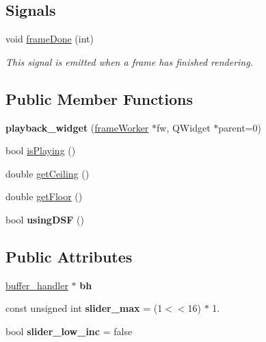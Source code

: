 \subsection*{Signals}
\begin{DoxyCompactItemize}
\item 
\hypertarget{classplayback__widget_aea2a79a747ca2a8690481ad9fbd30ad4}{void \hyperlink{classplayback__widget_aea2a79a747ca2a8690481ad9fbd30ad4}{frame\+Done} (int)}\label{classplayback__widget_aea2a79a747ca2a8690481ad9fbd30ad4}

\begin{DoxyCompactList}\small\item\em This signal is emitted when a frame has finished rendering. \end{DoxyCompactList}\end{DoxyCompactItemize}
\subsection*{Public Member Functions}
\begin{DoxyCompactItemize}
\item 
\hypertarget{classplayback__widget_a2d182d191c21f8167357d78a473c19b7}{{\bfseries playback\+\_\+widget} (\hyperlink{classframeWorker}{frame\+Worker} $\ast$fw, Q\+Widget $\ast$parent=0)}\label{classplayback__widget_a2d182d191c21f8167357d78a473c19b7}

\item 
bool \hyperlink{group__getters_ga601167298dbe870b1f2e9591f9372a75}{is\+Playing} ()
\item 
double \hyperlink{group__getters_gab47096c65caf5ac4f58049350a7a8289}{get\+Ceiling} ()
\item 
double \hyperlink{group__getters_gaf9c55fffe8aebf0cfb7c00b33b1e1a04}{get\+Floor} ()
\item 
\hypertarget{classplayback__widget_ae40db438ff07e5b5462a2f33ce067674}{bool {\bfseries using\+D\+S\+F} ()}\label{classplayback__widget_ae40db438ff07e5b5462a2f33ce067674}

\end{DoxyCompactItemize}
\subsection*{Public Attributes}
\begin{DoxyCompactItemize}
\item 
\hypertarget{classplayback__widget_a92eeaf4eac0a78442cafb7975ac796a3}{\hyperlink{classbuffer__handler}{buffer\+\_\+handler} $\ast$ {\bfseries bh}}\label{classplayback__widget_a92eeaf4eac0a78442cafb7975ac796a3}

\item 
\hypertarget{classplayback__widget_ab460aa8fe5d007b2964f39bd57e10c43}{const unsigned int {\bfseries slider\+\_\+max} = (1$<$$<$16) $\ast$ 1.}\label{classplayback__widget_ab460aa8fe5d007b2964f39bd57e10c43}

\item 
\hypertarget{classplayback__widget_ae591005a7d541ed23def727d85701b8c}{bool {\bfseries slider\+\_\+low\+\_\+inc} = false}\label{classplayback__widget_ae591005a7d541ed23def727d85701b8c}

\end{DoxyCompactItemize}
